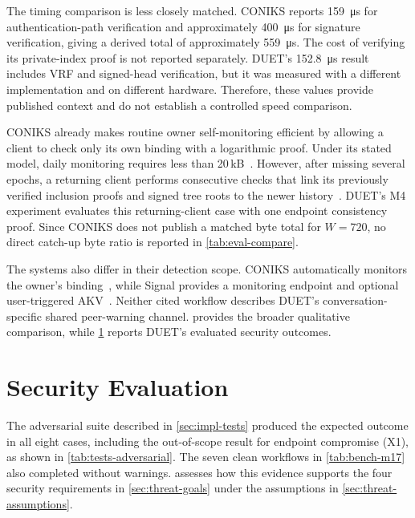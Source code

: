 The timing comparison is less closely matched. CONIKS reports
\SI{159}{\micro\second} for authentication-path verification and approximately
\SI{400}{\micro\second} for signature verification, giving a derived total of approximately
\SI{559}{\micro\second}. The cost of verifying its private-index proof is not reported separately.
DUET's
\SI{152.8}{\micro\second} result includes VRF and signed-head verification, but it was measured with
a different implementation and on different hardware. Therefore, these values provide published
context and do not establish a controlled speed comparison.

CONIKS already makes routine owner self-monitoring efficient by allowing a client to check only its
own binding with a logarithmic proof. Under its stated model, daily monitoring requires less than
20\,kB~\cite[Section~5.3 and Table~1]{melara2015coniks}. However, after missing several epochs, a
returning client performs consecutive checks that link its previously verified inclusion proofs and
signed tree roots to the newer history~\cite{melara2015coniks}.
DUET's M4 experiment evaluates this returning-client case with one endpoint consistency proof.
Since CONIKS does not publish a matched byte total for $W=720$, no direct catch-up byte ratio is
reported in \cref{tab:eval-compare}.

The systems also differ in their detection scope. CONIKS automatically monitors the owner's
binding~\cite[Sections~2 and 4.1.3]{melara2015coniks}, while Signal provides a monitoring endpoint and optional user-triggered
AKV~\cite{signal-kt-server,signal-akv}. Neither cited workflow describes DUET's
conversation-specific shared peer-warning channel.  provides the broader
qualitative comparison, while \cref{sec:eval-security} reports DUET's evaluated security outcomes.

\section{Security Evaluation}\label{sec:eval-security}

The adversarial suite described in \cref{sec:impl-tests} produced the expected outcome in all eight
cases, including the out-of-scope result for endpoint compromise (X1), as shown in
\cref{tab:tests-adversarial}. The seven clean workflows in \cref{tab:bench-m17} also completed
without warnings.  assesses how this evidence supports the four security
requirements in \cref{sec:threat-goals} under the assumptions in
\cref{sec:threat-assumptions}.

